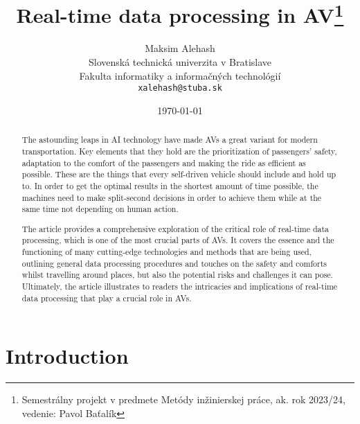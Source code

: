 \documentclass[10pt,oneside,english,a4paper]{article}
\title{Real-time data processing in AV\thanks{Semestrálny projekt v predmete Metódy inžinierskej práce, ak. rok 2023/24, vedenie: Pavol Baťalík}} %
\author{Maksim Alehash\\[2pt]
	{\small Slovenská technická univerzita v Bratislave}\\
	{\small Fakulta informatiky a informačných technológií}\\
	{\small \texttt{xalehash@stuba.sk}}
	}
\date{\small\today} %
\begin{document}
\maketitle

\begin{abstract}
The astounding leaps in AI technology have made AVs a great variant for modern transportation. Key elements that they hold are the prioritization of passengers' safety, adaptation to the comfort of the passengers and making the ride as efficient as possible. These are the things that every self-driven vehicle should include and hold up to. In order to get the optimal results in the shortest amount of time possible, the machines need to make split-second decisions in order to achieve them while at the same time not depending on human action. 
\par The article provides a comprehensive exploration of the critical role of real-time data processing, which is one of the most crucial parts of AVs. It covers the essence and the functioning of many cutting-edge technologies and methods that are being used, outlining general data processing procedures and touches on the safety and comforts whilst travelling around places, but also the potential risks and challenges it can pose. Ultimately, the article illustrates to readers the intricacies and implications of real-time data processing that play a crucial role in AVs.

\end{abstract}

\newpage\tableofcontents

\newpage\section{Introduction}
\end{document}
